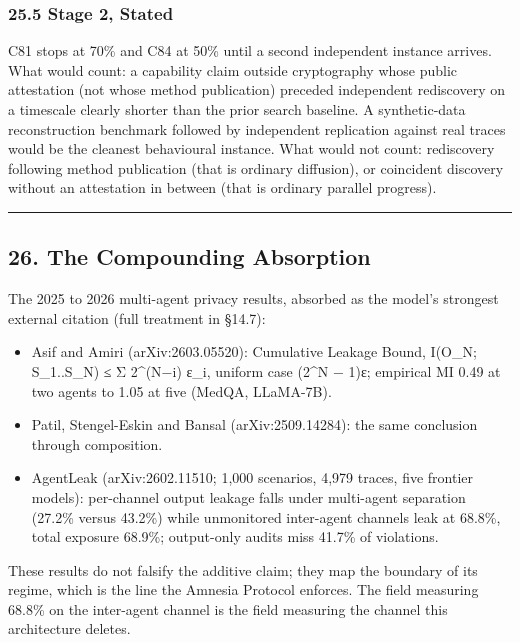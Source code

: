 \documentclass[
]{article}
\providecommand{\tightlist}{%
  \setlength{\itemsep}{0pt}\setlength{\parskip}{0pt}}
\begin{document}
\subsubsection{25.5 Stage 2, Stated}\label{stage-2-stated}

C81 stops at 70\% and C84 at 50\% until a second independent instance
arrives. What would count: a capability claim outside cryptography whose
public attestation (not whose method publication) preceded independent
rediscovery on a timescale clearly shorter than the prior search
baseline. A synthetic-data reconstruction benchmark followed by
independent replication against real traces would be the cleanest
behavioural instance. What would not count: rediscovery following method
publication (that is ordinary diffusion), or coincident discovery
without an attestation in between (that is ordinary parallel progress).

\begin{center}\rule{0.5\linewidth}{0.5pt}\end{center}

\subsection{26. The Compounding
Absorption}\label{the-compounding-absorption}

The 2025 to 2026 multi-agent privacy results, absorbed as the model's
strongest external citation (full treatment in §14.7):

\begin{itemize}
\tightlist
\item
  Asif and Amiri (arXiv:2603.05520): Cumulative Leakage Bound, I(O\_N;
  S\_1..S\_N) ≤ Σ 2\^{}(N−i) ε\_i, uniform case (2\^{}N − 1)ε; empirical
  MI 0.49 at two agents to 1.05 at five (MedQA, LLaMA-7B).
\item
  Patil, Stengel-Eskin and Bansal (arXiv:2509.14284): the same
  conclusion through composition.
\item
  AgentLeak (arXiv:2602.11510; 1,000 scenarios, 4,979 traces, five
  frontier models): per-channel output leakage falls under multi-agent
  separation (27.2\% versus 43.2\%) while unmonitored inter-agent
  channels leak at 68.8\%, total exposure 68.9\%; output-only audits
  miss 41.7\% of violations.
\end{itemize}

These results do not falsify the additive claim; they map the boundary
of its regime, which is the line the Amnesia Protocol enforces. The
field measuring 68.8\% on the inter-agent channel is the field measuring
the channel this architecture deletes.
\end{document}
